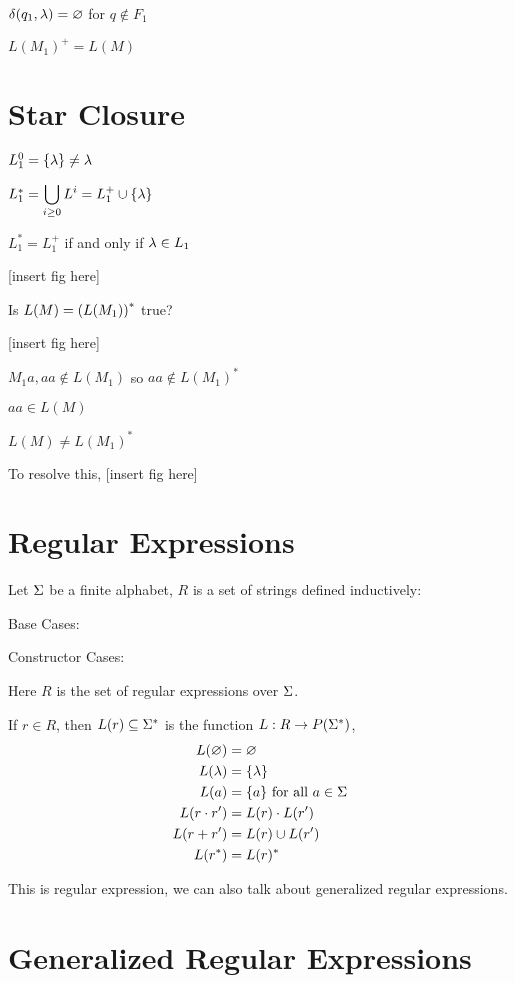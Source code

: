 \documentclass[11pt, cyan, night, 0.5in]{LatexTemplate/hw}
\begin{document}
$\delta(q_1,\lambda)=\varnothing$ for $q\notin F_1$

$L(M_1)^+=L(M)$

\section{Star Closure}

$L_1^0 = \{\lambda\}\neq \lambda$

$L_1^*=\displaystyle\bigcup_{i\ge0}L^i=L_1^+\cup\{\lambda\}$

$L_1^*=L_1^+$ if and only if $\lambda\in L_1$

[insert fig here]

Is $L(M)=\left(L(M_1)\right)^*$ true?


[insert fig here]

$M_1 a,aa\notin L(M_1)$ so $aa\notin L(M_1)^*$

$aa\in L(M)$

$L(M)\neq L(M_1)^*$

To resolve this, [insert fig here]

\section{Regular Expressions}

Let $\Sigma$ be a finite alphabet, $R$ is a set of strings defined inductively:

Base Cases:

Constructor Cases:

Here $R$ is the set of regular expressions over $\Sigma$.

If $r\in R$, then $L(r)\subseteq \Sigma^*$ is the function $L: R\to P(\Sigma^*)$,
\begin{align*}
    L(\varnothing)&=\varnothing\\
    L(\lambda)&=\{\lambda\}\\
    L(a)&=\{a\}\text{ for all }a\in\Sigma\\
    L(r\cdot r')&=L(r)\cdot L(r')\\
    L(r+r')&=L(r)\cup L(r')\\
    L(r^*)&=L(r)^*
\end{align*}

This is regular expression, we can also talk about generalized regular expressions.

\section{Generalized Regular Expressions}
\end{document}
